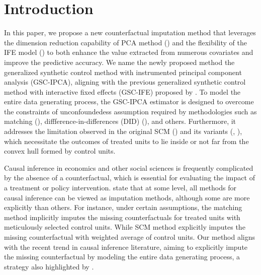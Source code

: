 \documentclass[12pt]{article}
\begin{document}
\doublespacing

\section{Introduction} 
\label{sec:introduction}

In this paper, we propose a new counterfactual imputation method that leverages the dimension reduction capability of PCA method (\cite{jollife2016principal}) and the flexibility of the IFE model (\cite{bai2003computation}) to both enhance the value extracted from numerous covariates and improve the predictive accuracy. We name the newly proposed method the generalized synthetic control method with instrumented principal component analysis (GSC-IPCA), aligning with the previous generalized synthetic control method with interactive fixed effects (GSC-IFE) proposed by \cite{xu2017generalized}. To model the entire data generating process, the GSC-IPCA estimator is designed to overcome the constraints of unconfoundedess assumption required by methodologies such as matching (\cite{abadie2011bias, abadie2006large}), diffference-in-differences (DID) (\cite{card1993minimum}), and others. Furthermore, it addresses the limitation observed in the original SCM (\cite{abadie2010synthetic}) and its variants (\cite{ben2021augmented}, \cite{arkhangelsky2021synthetic}), which necessitate the outcomes of treated units to lie inside or not far from the convex hull formed by control units. 

Causal inference in economics and other social sciences is frequently complicated by the absence of a counterfactual, which is essential for evaluating the impact of a treatment or policy intervention. \cite{imbens2015causal} state that at some level, all methods for causal inference can be viewed as imputation methods, although some are more explicitly than others. For instance, under certain assumptions, the matching method implicitly imputes the missing counterfactuals for treated units with meticulously selected control units. While SCM method explicitly imputes the missing counterfactual with weighted average of control units. Our method aligns with the recent trend in causal inference literature, aiming to explicitly impute the missing counterfactual by modeling the entire data generating process, a strategy also highlighted by \cite{athey2021matrix}.
\end{document}
